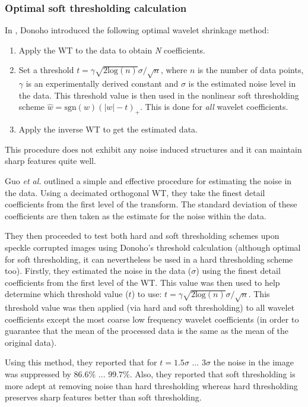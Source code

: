 \documentclass[12pt]{report}
\begin{document}
\subsubsection{Optimal soft thresholding calculation}
In \cite{don95}, Donoho introduced the following optimal wavelet shrinkage method:
\begin{enumerate}
	\item Apply the WT to the data to obtain \emph{N} coefficients.
	\item Set a threshold $t = \gamma \sqrt{2\mbox{log}(n)}\sigma / \sqrt{n}$, where
	$n$ is the number of data points, $\gamma$ is an experimentally derived constant 
	and $\sigma$ is the estimated
	noise level in the data.
	This threshold value is then used in the nonlinear soft thresholding scheme
	$\hat{w} = \mbox{sgn}(w)(|w|-t)_{+}$. This is done for \emph{all}
	wavelet coefficients.
	\item Apply the inverse WT to get the estimated data.
\end{enumerate}

This procedure does not exhibit any noise induced structures
and
it can maintain sharp features quite well. 

Guo \emph{et al.} \cite{guo} outlined a simple and effective procedure for estimating the noise
in the data. Using a decimated orthogonal WT, they take the finest
detail coefficients from the first level of the transform. The standard deviation of these 
coefficients are then taken as the estimate for the noise within the data.

They then proceeded to test both hard and soft thresholding schemes upon speckle corrupted images using 
Donoho's \cite{don95} threshold calculation (although optimal for soft thresholding,
it can nevertheless be used in a hard thresholding scheme too).
Firstly, they estimated the noise in the data ($\sigma$) using the finest
detail coefficients from the first level of the WT. This value
was then used to help determine which threshold value ($t$) to use: 
$t = \gamma \sqrt{2\mbox{log}(n)}\sigma / \sqrt{n}$. This threshold value was then
applied (via hard and soft thresholding) to all wavelet coefficients except the most coarse low frequency 
wavelet coefficients (in order to guarantee that the mean of the processed data is the same 
as the mean of the original data).

Using this method, they reported that for $t = 1.5\sigma \mbox{ ... } 3\sigma$
the noise in the image was suppressed by $86.6\% \mbox{ ... } 99.7\%$. Also,
they reported that soft thresholding is more adept at removing noise than hard thresholding 
whereas hard thresholding preserves sharp features better than soft thresholding.
\end{document}
